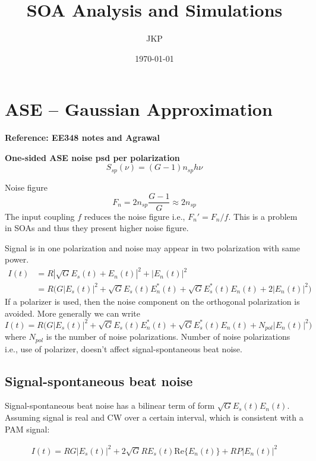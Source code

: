 \documentclass[a4paper]{article}
\title{SOA Analysis and Simulations}
\author{JKP}
\date{\today}
\begin{document}
\maketitle



\section{ASE -- Gaussian Approximation}

\textbf{Reference: EE348 notes and Agrawal}

\textbf{One-sided ASE noise psd per polarization}
\begin{equation}
S_{sp}(\nu) = (G-1)n_{sp}h\nu
\end{equation}

Noise figure
\begin{equation}
F_n = 2n_{sp}\frac{G-1}{G} \approx 2n_{sp}
\end{equation}
The input coupling $f$ reduces the noise figure i.e., $F_n' = F_n/f$. This is a problem in SOAs and thus they present higher noise figure.

Signal is in one polarization and noise may appear in two polarization with same power.
\begin{align} \nonumber
I(t) &= R|\sqrt{G}E_s(t) + E_n(t)|^2 + |E_n(t)|^2 \\
& = R\Big(G|E_s(t)|^2 + \sqrt{G}E_s(t)E_n^*(t) + \sqrt{G}E_s^*(t)E_n(t) + 2|E_n(t)|^2\Big)
\end{align}
If a polarizer is used, then the noise component on the orthogonal polarization is avoided. More generally we can write
\begin{equation}
I(t) = R\Big(G|E_s(t)|^2 + \sqrt{G}E_s(t)E_n^*(t) + \sqrt{G}E_s^*(t)E_n(t) + N_{pol}|E_n(t)|^2\Big)
\end{equation}
where $N_{pol}$ is the number of noise polarizations. Number of noise polarizations i.e., use of polarizer, doesn't affect signal-spontaneous beat noise.

\subsection{Signal-spontaneous beat noise}
Signal-spontaneous beat noise has a bilinear term of form $\sqrt{G}E_s(t)E_n(t)$. Assuming signal is real and CW over a certain interval, which is consistent with a PAM signal:

\begin{align} \nonumber
I(t) = RG|E_s(t)|^2 + 2\sqrt{G}RE_s(t)\mathrm{Re}\{E_n(t)\} + RP|E_n(t)|^2
\end{align}
\end{document}
